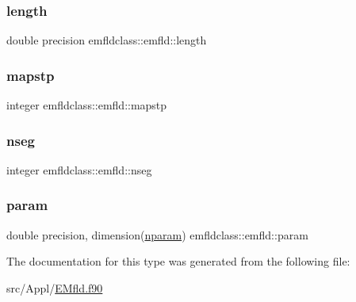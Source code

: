 \subsubsection{\texorpdfstring{length}{length}}
{\footnotesize\ttfamily double precision emfldclass\+::emfld\+::length}

\mbox{\label{structemfldclass_1_1emfld_ac18dfbe320fc1dc13393780eb0ae2613}} 
\subsubsection{\texorpdfstring{mapstp}{mapstp}}
{\footnotesize\ttfamily integer emfldclass\+::emfld\+::mapstp}

\mbox{\label{structemfldclass_1_1emfld_a35f0c51ff70d545cef92bbbfa9546006}} 
\subsubsection{\texorpdfstring{nseg}{nseg}}
{\footnotesize\ttfamily integer emfldclass\+::emfld\+::nseg}

\mbox{\label{structemfldclass_1_1emfld_ac4480d690e4e4d88d88ba939af8213cd}} 
\subsubsection{\texorpdfstring{param}{param}}
{\footnotesize\ttfamily double precision, dimension(\mbox{\hyperlink{namespaceemfldclass_ad6fed90f4153b92a9a9ff35a6ef146c3}{nparam}}) emfldclass\+::emfld\+::param}



The documentation for this type was generated from the following file\+:\begin{DoxyCompactItemize}
\item 
src/\+Appl/\mbox{\hyperlink{_e_mfld_8f90}{E\+Mfld.\+f90}}\end{DoxyCompactItemize}
